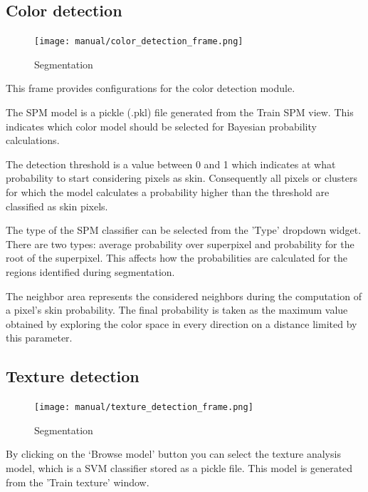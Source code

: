 \documentclass[12pt]{report}
\begin{document}
	\subsection{Color detection}
	
	\begin{figure}
		\begin{center}
			\texttt{[image: manual/color\_detection\_frame.png]}
		\end{center}
		\caption{Segmentation}
	\end{figure}

	This frame provides configurations for the color detection module.

	The SPM model is a pickle (.pkl) file generated from the Train SPM view. This indicates which color model should be selected for Bayesian probability calculations. 
	
	The detection threshold is a value between 0 and 1 which indicates at what probability to start considering pixels as skin. Consequently all pixels or clusters for which the model calculates a probability higher than the threshold are classified as skin pixels.
	
	The type of the SPM classifier can be selected from the 'Type' dropdown widget.
	There are two types: average probability over superpixel and probability for the root of the superpixel. This affects how the probabilities are calculated for the regions identified during segmentation.
	
	The neighbor area represents the considered neighbors during the computation of a pixel's skin probability. The final probability is taken as the maximum value obtained by exploring the color space in every direction on a distance limited by this parameter. 
	
	\subsection{Texture detection}
	\begin{figure}
		\begin{center}
			\texttt{[image: manual/texture\_detection\_frame.png]}
		\end{center}
		\caption{Segmentation}
	\end{figure}

	By clicking on the ‘Browse model’ button you can select the texture analysis model, which is a SVM classifier stored as a pickle file. This model is generated from the 'Train texture' window.
	
\end{document}
